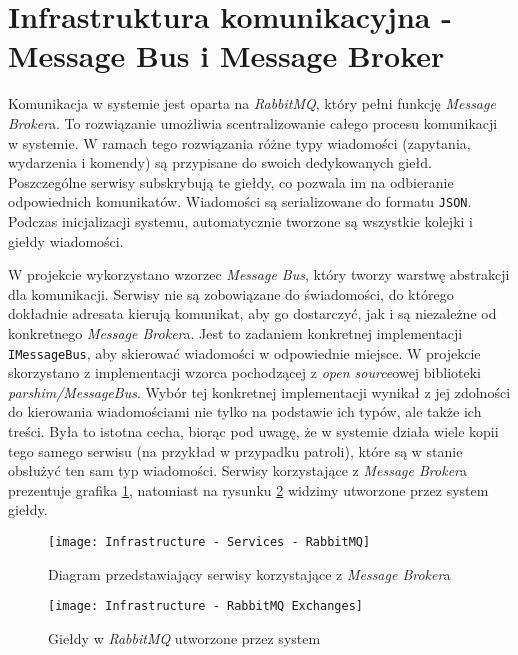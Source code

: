\section{Infrastruktura komunikacyjna - Message Bus i Message Broker}
\label{sec:infrastrukturaKomunikacyjna}

\par Komunikacja w systemie jest oparta na \emph{RabbitMQ}, który pełni funkcję \emph{Message Broker}a. To rozwiązanie umożliwia scentralizowanie całego procesu komunikacji w systemie. W ramach tego rozwiązania różne typy wiadomości (zapytania, wydarzenia i komendy) są przypisane do swoich dedykowanych giełd. Poszczególne serwisy subskrybują te giełdy, co pozwala im na odbieranie odpowiednich komunikatów. Wiadomości są serializowane do formatu \texttt{JSON}. Podczas inicjalizacji systemu, automatycznie tworzone są wszystkie kolejki i giełdy wiadomości.

\par W projekcie wykorzystano wzorzec \emph{Message Bus}, który tworzy warstwę abstrakcji dla komunikacji. Serwisy nie są zobowiązane do świadomości, do którego dokładnie adresata kierują komunikat, aby go dostarczyć, jak i są niezależne od konkretnego \emph{Message Broker}a. Jest to zadaniem konkretnej implementacji \texttt{IMessageBus}, aby skierować wiadomości w odpowiednie miejsce. W projekcie skorzystano z implementacji wzorca pochodzącej z \emph{open source}owej biblioteki \emph{parshim/MessageBus}\cite{PARSHIM_MESSAGEBUS_GITHUB}. Wybór tej konkretnej implementacji wynikał z jej zdolności do kierowania wiadomościami nie tylko na podstawie ich typów, ale także ich treści. Była to istotna cecha, biorąc pod uwagę, że w systemie działa wiele kopii tego samego serwisu (na przykład w przypadku patroli), które są w stanie obsłużyć ten sam typ wiadomości. Serwisy korzystające z \emph{Message Broker}a prezentuje grafika \ref{fig:infrastructureServicesRabbitMq}, natomiast na rysunku \ref{fig:infrastructureRabbitMqExchanges} widzimy utworzone przez system giełdy.

\begin{figure}
    \centering
    \texttt{[image: Infrastructure - Services - RabbitMQ]}
    \caption{Diagram przedstawiający serwisy korzystające z \emph{Message Broker}a}
    \label{fig:infrastructureServicesRabbitMq}
\end{figure}

\begin{figure}
    \centering
    \texttt{[image: Infrastructure - RabbitMQ Exchanges]}
    \caption{Giełdy w \emph{RabbitMQ} utworzone przez system}
    \label{fig:infrastructureRabbitMqExchanges}
\end{figure}

